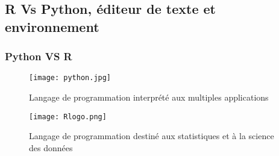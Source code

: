 \documentclass{beamer}
\theoremstyle{definition}
\begin{document}
\subsection{R Vs Python, éditeur de texte et environnement}
\begin{frame}
	\frametitle{Python VS R}
	
	\begin{minipage}[t]{1\linewidth}
		\begin{minipage}[t]{0.5\linewidth}
			\begin{figure}
				
				\texttt{[image: python.jpg]}\\[0.5cm]
				\centering
				\caption*{Langage de programmation interprété aux multiples applications}
			\end{figure}
		\end{minipage}\hfil
		\begin{minipage}[t]{0.45\linewidth}
			\begin{figure}
				\texttt{[image: Rlogo.png]}\\[0.5cm]
				\centering
				\caption*{Langage de programmation destiné aux statistiques et à la science des données}
			\end{figure}
		\end{minipage}
	\end{minipage}	
	
\end{frame}
\end{document}
